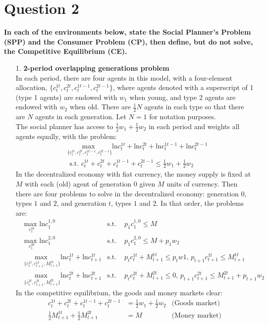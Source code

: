 \documentclass{article}
\begin{document}
\section*{Question 2}
\textbf{In each of the environments below, state the Social Planner's Problem (SPP) and the Consumer Problem (CP), then define, but do not solve, the Competitive Equilibrium (CE).}
\medskip \\
\begin{itemize}
	\item[1.] \textbf{2-period overlapping generations problem}
		\medskip \\
		In each period, there are four agents in this model, with a four-element allocation, $\{c_t^{1t},c_t^{2t},c_t^{1t-1},c_t^{2t-1}\}$, where agents denoted with a superscript of 1 (type 1 agents) are endowed with $w_1$ when young, and type 2 agents are endowed with $w_2$ when old. There are $\frac{1}{2}N$ agents in each type so that there are $N$ agents in each generation. Let $N=1$ for notation purposes.
		\smallskip \\
		The social planner has access to $\frac{1}{2}w_1+\frac{1}{2}w_2$ in each period and weights all agents equally, with the problem:
		\begin{align*}
			&\underset{\{c_t^{1t},c_t^{2t},c_t^{1t-1},c_t^{2t-1}\}}{\text{max }}\text{ln}c_t^{1t}+\text{ln}c_t^{2t}+\text{ln}c_t^{1t-1}+\text{ln}c_t^{2t-1} \\
			&\text{  s.t.  }c_t^{1t}+c_t^{2t}+c_t^{1t-1}+c_t^{2t-1}\leq\frac{1}{2}w_1+\frac{1}{2}w_2
		\end{align*}
		In the decentralized economy with fiat currency, the money supply is fixed at $M$ with each (old) agent of generation $0$ given $M$ units of currency. Then there are four problems to solve in the decentralized economy: generation $0$, types $1$ and $2$, and generation $t$, types $1$ and $2$. In that order, the problems are:
		\begin{align*}
			&\underset{c_1^{10}}{\text{max }}\text{ln}c_1^{1,0}											 &\text{s.t. } &p_1c_1^{1,0}	\leq M 				\\
			&\underset{c_1^{20}}{\text{max }}\text{ln}c_1^{2,0}											 &\text{s.t. } &p_1c_1^{2,0}	\leq M + p_1 w_2	\\
			&\underset{\{c_t^{1t},c_{t+1}^{1t},M^{1t}_{t+1}\}}{\text{max }} \text{ln}c_t^{1t} + \text{ln}c_{t+1}^{1t}
				&\text{s.t. } 	&p_tc_t^{1t} + M^{1t}_{t+1}	\leq p_tw1\text{, }p_{t+1}c^{1t}_{t+1}		\leq M^{1t}_{t+1}	\\
			&\underset{\{c_t^{2t},c_{t+1}^{2t},M^{2t}_{t+1}\}}{\text{max }} \text{ln}c_t^{2t} + \text{ln}c_{t+1}^{2t}
				&\text{s.t. } 	&p_tc_t^{2t} + M^{2t}_{t+1}	\leq 0\text{, }p_{t+1}c^{2t}_{t+1}		\leq M^{2t}_{t+1} + p_{t+1}w_2	
		\end{align*}
		In the competitive equilibrium, the goods and money markets clear:
		\begin{align*}
			c_t^{1t}+c_t^{2t}+c_t^{1t-1}+c_t^{2t-1} 		&= \frac{1}{2}w_1+\frac{1}{2}w_2	&\text{(Goods market)}	\\
			\frac{1}{2}M_{t+1}^{1t}+\frac{1}{2}M_{t+1}^{2t}	&= M								&\text{(Money market)}	
		\end{align*}
		

\end{itemize}
\end{document}
